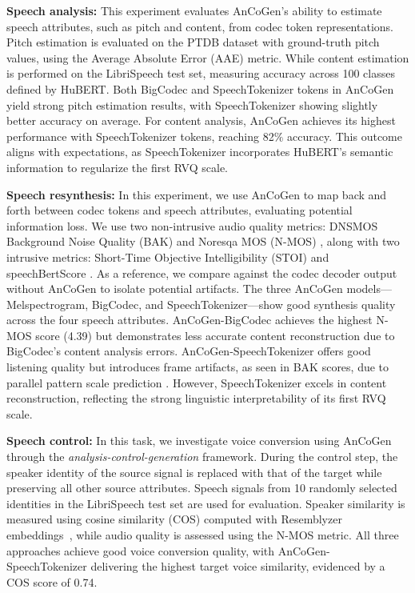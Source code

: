 \documentclass{Interspeech}
\begin{document}
\noindent\textbf{Speech analysis:} This experiment evaluates AnCoGen's ability to estimate speech attributes, such as pitch and content, from codec token representations. Pitch estimation is evaluated on the PTDB dataset \cite{pirker2011pitch} with ground-truth pitch values, using the Average Absolute Error (AAE) metric. While content estimation is performed on the LibriSpeech test set, measuring accuracy across 100 classes defined by HuBERT. Both BigCodec and SpeechTokenizer tokens in AnCoGen yield strong pitch estimation results, with SpeechTokenizer showing slightly better accuracy on average. For content analysis, AnCoGen achieves its highest performance with SpeechTokenizer tokens, reaching 82$\%$ accuracy. This outcome aligns with expectations, as SpeechTokenizer incorporates HuBERT's semantic information to regularize the first RVQ scale.

\noindent\textbf{Speech resynthesis:} In this experiment, we use AnCoGen to map back and forth between codec tokens and speech attributes, evaluating potential information loss. We use two non-intrusive audio quality metrics: DNSMOS Background Noise Quality (BAK) \cite{reddy2022dnsmos} and Noresqa MOS (N-MOS) \cite{manocha2021noresqa, kumar2023torchaudio}, along with two intrusive metrics: Short-Time Objective Intelligibility (STOI) \cite{taal2010short} and speechBertScore \cite{saeki2024speechbertscore}. As a reference, we compare against the codec decoder output without AnCoGen to isolate potential artifacts. The three AnCoGen models—Melspectrogram, BigCodec, and SpeechTokenizer—show good synthesis quality across the four speech attributes. AnCoGen-BigCodec achieves the highest N-MOS score (4.39) but demonstrates less accurate content reconstruction due to BigCodec's content analysis errors. AnCoGen-SpeechTokenizer offers good listening quality but introduces frame artifacts, as seen in BAK scores, due to parallel pattern scale prediction \cite{copet2024simple}. However, SpeechTokenizer excels in content reconstruction, reflecting the strong linguistic interpretability of its first RVQ scale.

\noindent\textbf{Speech control:} In this task, we investigate voice conversion using AnCoGen through the \emph{analysis-control-generation} framework. During the control step, the speaker identity of the source signal is replaced with that of the target while preserving all other source attributes. Speech signals from 10 randomly selected identities in the LibriSpeech test set are used for evaluation. Speaker similarity is measured using cosine similarity (COS) computed with Resemblyzer embeddings~\cite{wan2018generalized}, while audio quality is assessed using the N-MOS metric. All three approaches achieve good voice conversion quality, with AnCoGen-SpeechTokenizer delivering the highest target voice similarity, evidenced by a COS score of 0.74.
\end{document}
